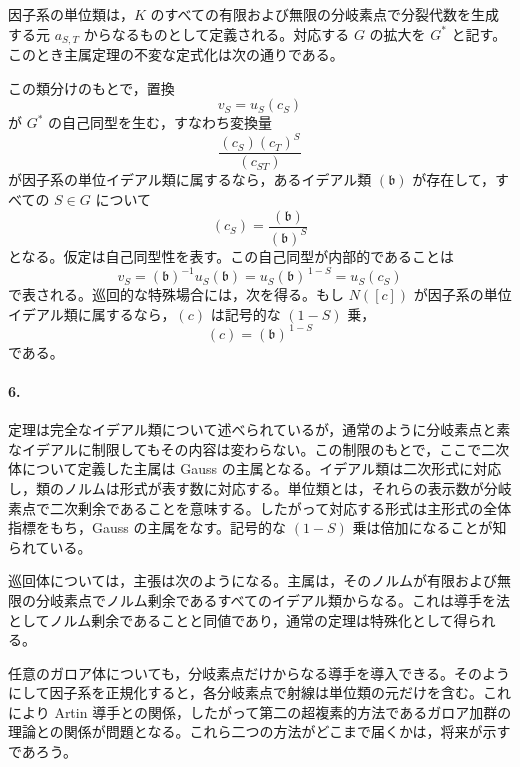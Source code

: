因子系の単位類は，\(K\) のすべての有限および無限の分岐素点で分裂代数を生成する元 \(a_{S,T}\) からなるものとして定義される。対応する \(G\) の拡大を \(G^*\) と記す。このとき主属定理の不変な定式化は次の通りである。

この類分けのもとで，置換
\[
        v_S=u_S(c_S)
\]
が \(G^*\) の自己同型を生む，すなわち変換量
\[
        \frac{(c_S)(c_T)^S}{(c_{ST})}
\]
が因子系の単位イデアル類に属するなら，あるイデアル類 \((\mathfrak b)\) が存在して，すべての \(S\in G\) について
\[
        (c_S)=\frac{(\mathfrak b)}{(\mathfrak b)^S}
\]
となる。仮定は自己同型性を表す。この自己同型が内部的であることは
\[
        v_S=(\mathfrak b)^{-1}u_S(\mathfrak b)
        =u_S(\mathfrak b)^{\,1-S}=u_S(c_S)
\]
で表される。巡回的な特殊場合には，次を得る。もし \(N([c])\) が因子系の単位イデアル類に属するなら，\((c)\) は記号的な \((1-S)\) 乗，
\[
        (c)=(\mathfrak b)^{\,1-S}
\]
である。

\paragraph{6.}
定理は完全なイデアル類について述べられているが，通常のように分岐素点と素なイデアルに制限してもその内容は変わらない。この制限のもとで，ここで二次体について定義した主属は Gauss の主属となる。イデアル類は二次形式に対応し，類のノルムは形式が表す数に対応する。単位類とは，それらの表示数が分岐素点で二次剰余であることを意味する。したがって対応する形式は主形式の全体指標をもち，Gauss の主属をなす。記号的な \((1-S)\) 乗は倍加になることが知られている。

巡回体については，主張は次のようになる。主属は，そのノルムが有限および無限の分岐素点でノルム剰余であるすべてのイデアル類からなる。これは導手を法としてノルム剰余であることと同値であり，通常の定理は特殊化として得られる。

任意のガロア体についても，分岐素点だけからなる導手を導入できる。そのようにして因子系を正規化すると，各分岐素点で射線は単位類の元だけを含む。これにより Artin 導手との関係，したがって第二の超複素的方法であるガロア加群の理論との関係が問題となる。これら二つの方法がどこまで届くかは，将来が示すであろう。